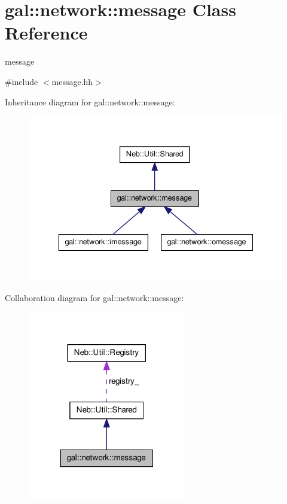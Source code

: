 \hypertarget{classgal_1_1network_1_1message}{\section{gal\-:\-:network\-:\-:message \-Class \-Reference}
\label{classgal_1_1network_1_1message}
}


message  




{\ttfamily \#include $<$message.\-hh$>$}



\-Inheritance diagram for gal\-:\-:network\-:\-:message\-:\nopagebreak
\begin{figure}[H]
\begin{center}
\leavevmode
\includegraphics[width=336pt]{classgal_1_1network_1_1message__inherit__graph}
\end{center}
\end{figure}


\-Collaboration diagram for gal\-:\-:network\-:\-:message\-:\nopagebreak
\begin{figure}[H]
\begin{center}
\leavevmode
\includegraphics[width=196pt]{classgal_1_1network_1_1message__coll__graph}
\end{center}
\end{figure}
